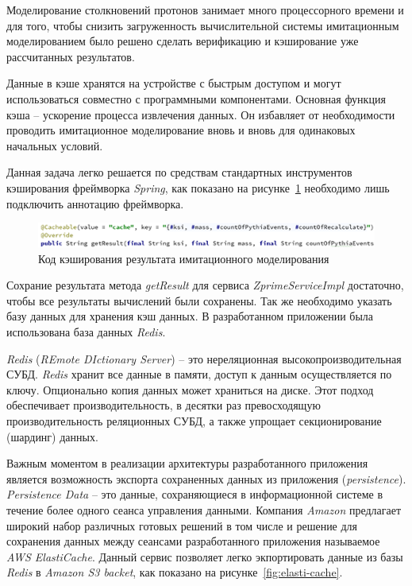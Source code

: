 Моделирование столкновений протонов занимает много процессорного времени и для того, чтобы снизить загруженность вычислительной системы имитационным моделированием было решено сделать верификацию и кэширование уже рассчитанных результатов. 

Данные в кэше хранятся на устройстве с быстрым доступом и могут использоваться совместно с программными компонентами. Основная функция кэша – ускорение процесса извлечения данных. Он избавляет от необходимости проводить имитационное моделирование вновь и вновь для одинаковых начальных условий.

Данная задача легко решается по средствам стандартных инструментов кэширования фреймворка \textit{Spring}, как показано на рисунке~\ref{fig:cache} необходимо лишь подключить аннотацию фреймворка.

\begin{figure}[!h]
	\centering
	\includegraphics[width=\textwidth]{figures/cache.png}
	\caption{Код кэширования результата имитационного моделирования}
	\label{fig:cache}
\end{figure}

Сохрание результата метода \textit{getResult} для сервиса \textit{ZprimeServiceImpl} достаточно, чтобы все результаты вычислений были сохранены. Так же необходимо указать базу данных для хранения кэш данных. В разработанном приложении была использована база данных \textit{Redis}.

\textit{Redis} (\textit{REmote DIctionary Server}) -- это нереляционная высокопроизводительная СУБД. \textit{Redis} хранит все данные в памяти, доступ к данным осуществляется по ключу. Опционально копия данных может храниться на диске. Этот подход обеспечивает производительность, в десятки раз превосходящую производительность реляционных СУБД, а также упрощает секционирование (шардинг) данных.

Важным моментом в реализации архитектуры разработанного приложения является возможность экспорта сохраненных данных из приложения (\textit{persistence}). \textit{Persistence Data} -- это данные, сохраняющиеся в информационной системе в течение более одного сеанса управления данными. Компания \textit{Amazon} предлагает широкий набор различных готовых решений в том числе и решение для сохранения данных между сеансами разработанного приложения называемое \textit{AWS ElastiCache}. Данный сервис позволяет легко экпортировать данные из базы \textit{Redis} в \textit{Amazon S3 backet}, как показано на рисунке~\ref{fig:elasti-cache}. 

